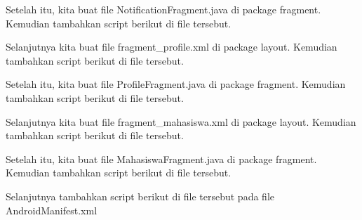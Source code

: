 Setelah itu, kita buat file NotificationFragment.java di package fragment. Kemudian tambahkan script berikut di file tersebut.


Selanjutnya kita buat file fragment\_profile.xml di package layout. Kemudian tambahkan script berikut di file tersebut.


Setelah itu, kita buat file ProfileFragment.java di package fragment. Kemudian tambahkan script berikut di file tersebut.


Selanjutnya kita buat file fragment\_mahasiswa.xml di package layout. Kemudian tambahkan script berikut di file tersebut.


Setelah itu, kita buat file MahasiswaFragment.java di package fragment. Kemudian tambahkan script berikut di file tersebut.


Selanjutnya tambahkan script berikut di file tersebut pada file AndroidManifest.xml
